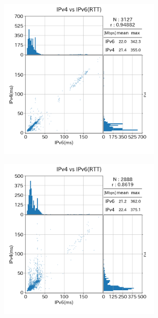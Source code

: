 \begin{figure}
    \begin{center}
        \begin{minipage}[t]{0.48\textwidth}
            \begin{subfigure}[b]{\textwidth}
                \centering
                \includegraphics[width=0.85\textwidth]{fig/old_IPv4aaS_rtt.png}
                \label{old_IPv4aaS_rtt}
            \end{subfigure}
            \begin{subfigure}[b]{\textwidth}
                \centering
                \includegraphics[width=0.85\textwidth]{fig/old_mix_rtt.png}

\end{subfigure}
\end{minipage}
\end{center}
\end{figure}
